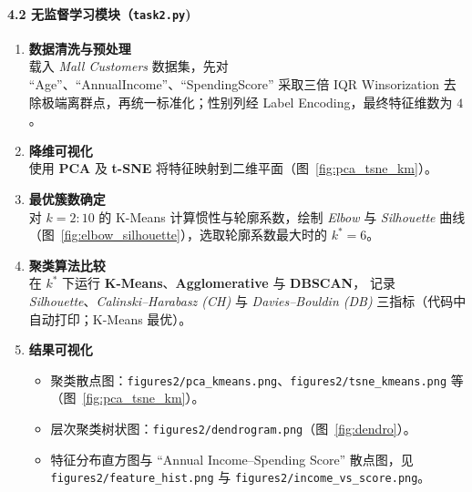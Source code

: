 \documentclass[UTF8]{ctexart}
\begin{document}
\paragraph{4.2 无监督学习模块（\texttt{task2.py})}
\begin{enumerate}[label=\arabic*)]
    \item \textbf{数据清洗与预处理}\\
          载入 \textit{Mall Customers} 数据集，先对 ``Age''、``AnnualIncome''、``SpendingScore'' 采取三倍 IQR Winsorization 去除极端离群点，再统一标准化；性别列经 Label Encoding，最终特征维数为 \(4\)。
    \item \textbf{降维可视化}\\
          使用 \textbf{PCA} 及 \textbf{t-SNE} 将特征映射到二维平面（图~\ref{fig:pca_tsne_km}）。
    \item \textbf{最优簇数确定}\\
          对 \(k=2\!:\!10\) 的 K-Means 计算惯性与轮廓系数，绘制 \emph{Elbow} 与 \emph{Silhouette} 曲线（图~\ref{fig:elbow_silhouette}），选取轮廓系数最大时的 \(k^\ast=6\)。
    \item \textbf{聚类算法比较}\\
          在 \(k^\ast\) 下运行
          \textbf{K-Means}、\textbf{Agglomerative} 与 \textbf{DBSCAN}，
          记录 \emph{Silhouette}、\emph{Calinski–Harabasz (CH)} 与 \emph{Davies–Bouldin (DB)} 三指标（代码中自动打印；K-Means 最优）。
    \item \textbf{结果可视化}\\[-0.8em]
          \begin{itemize}
              \item 聚类散点图：\verb|figures2/pca_kmeans.png|、\verb|figures2/tsne_kmeans.png| 等（图~\ref{fig:pca_tsne_km}）。
              \item 层次聚类树状图：\verb|figures2/dendrogram.png|（图~\ref{fig:dendro}）。
              \item 特征分布直方图与 ``Annual Income–Spending Score'' 散点图，见 \verb|figures2/feature_hist.png| 与 \verb|figures2/income_vs_score.png|。
          \end{itemize}
\end{enumerate}
\end{document}
